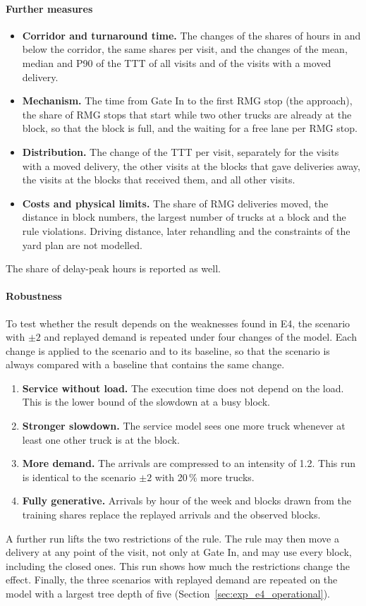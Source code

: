 \paragraph{Further measures}
\begin{itemize}
\item \textbf{Corridor and turnaround time.} The changes of the shares of hours in
and below the corridor, the same shares per visit, and the changes of the mean,
median and P90 of the TTT of all visits and of the visits with a moved delivery.
\item \textbf{Mechanism.} The time from Gate In to the first RMG stop (the
approach), the share of RMG stops that start while two other trucks are already at
the block, so that the block is full, and the waiting for a free lane per RMG stop.
\item \textbf{Distribution.} The change of the TTT per visit, separately for the
visits with a moved delivery, the other visits at the blocks that gave
deliveries away, the visits at the blocks that received them, and all other visits.
\item \textbf{Costs and physical limits.} The share of RMG deliveries moved, the
distance in block numbers, the largest number of trucks at a block and the rule
violations. Driving distance, later rehandling and the constraints of the yard plan
are not modelled.
\end{itemize}
The share of delay-peak hours is reported as well.

\paragraph{Robustness}
To test whether the result depends on the weaknesses found in E4, the scenario with
$\pm 2$ and replayed demand is repeated under four changes of the model. Each change
is applied to the scenario and to its baseline, so that the scenario is always
compared with a baseline that contains the same change.
\begin{enumerate}[label=(\alph*)]
\item \textbf{Service without load.} The execution time does not depend on the
load. This is the lower bound of the slowdown at a busy block.
\item \textbf{Stronger slowdown.} The service model sees one more truck whenever at
least one other truck is at the block.
\item \textbf{More demand.} The arrivals are compressed to an intensity of 1.2.
This run is identical to the scenario $\pm 2$ with 20\,\% more trucks.
\item \textbf{Fully generative.} Arrivals by hour of the week and blocks drawn from
the training shares replace the replayed arrivals and the observed blocks.
\end{enumerate}
A further run lifts the two restrictions of the rule. The rule may then move a
delivery at any point of the visit, not only at Gate In, and may use every block,
including the closed ones. This run shows how much the restrictions change the effect. Finally, the three
scenarios with replayed demand are repeated on the model with a largest tree depth
of five (Section~\ref{sec:exp_e4_operational}).

